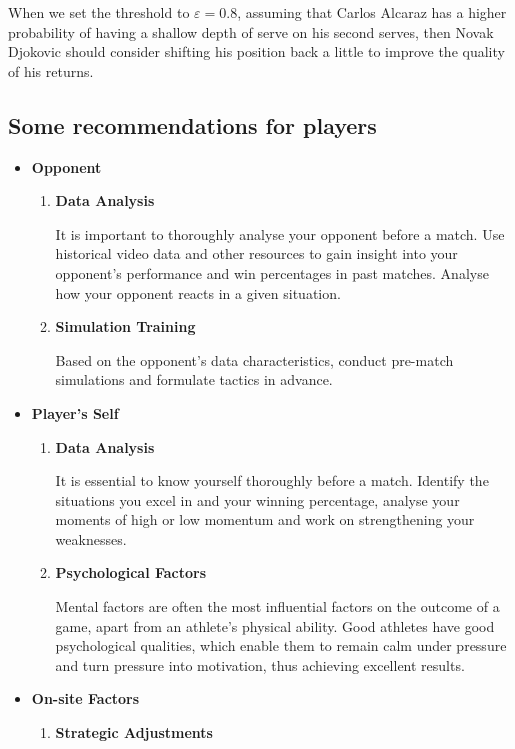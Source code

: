 \documentclass[12pt]{article}  %
\begin{document}
When we set the threshold to \(\varepsilon = 0.8\), assuming that Carlos Alcaraz has a higher probability of having a shallow depth of serve on his second serves, then Novak Djokovic should consider shifting his position back a little to improve the quality of his returns.

\subsection{Some recommendations for players}

\begin{itemize}
	\item \textbf{Opponent}
	\begin{enumerate}[label=\alph*.]
		\item \textbf{Data Analysis}
		
        It is important to thoroughly analyse your opponent before a match. Use historical video data and other resources to gain insight into your opponent's performance and win percentages in past matches. Analyse how your opponent reacts in a given situation.		
        \item \textbf{Simulation Training}
		
		Based on the opponent's data characteristics, conduct pre-match simulations and formulate tactics in advance.
	\end{enumerate}
	\item \textbf{Player's Self}
	\begin{enumerate}[label=\alph*.]
		\item \textbf{Data Analysis}
		
		It is essential to know yourself thoroughly before a match. Identify the situations you excel in and your winning percentage, analyse your moments of high or low momentum and work on strengthening your weaknesses.	
		\item \textbf{Psychological Factors}
		
		Mental factors are often the most influential factors on the outcome of a game, apart from an athlete's physical ability. Good athletes have good psychological qualities, which enable them to remain calm under pressure and turn pressure into motivation, thus achieving excellent results.
	\end{enumerate}
	\item \textbf{On-site Factors}
	\begin{enumerate}[label=\alph*.]
		\item \textbf{Strategic Adjustments}


\end{enumerate}
\end{itemize}
\end{document}
